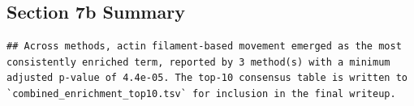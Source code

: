 \documentclass[
]{article}
\begin{document}
\subsection{Section 7b Summary}\label{section-7b-summary}

\begin{verbatim}
## Across methods, actin filament-based movement emerged as the most consistently enriched term, reported by 3 method(s) with a minimum adjusted p-value of 4.4e-05. The top-10 consensus table is written to `combined_enrichment_top10.tsv` for inclusion in the final writeup.
\end{verbatim}
\end{document}
